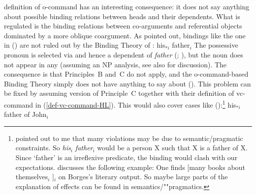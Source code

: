 \documentclass[output=paper,biblatex,babelshorthands,newtxmath,draftmode,colorlinks,citecolor=brown]{langscibook}
\begin{document}
 definition of o-command has an interesting consequence: it does not say anything about possible
binding relations between heads and their dependents. What is regulated is the binding relations
between co-arguments and referential objects dominated by a more oblique coargument. As
\citet[]{Mueller99a} pointed out, bindings like the one in () are not ruled out by
the Binding Theory of \citet[Chapter~6]{ps2}: 
\ea
his$_{*i}$ father$_i$
\z
The possessive pronoun is selected via \spr and hence a dependent of \emph{father}
(\citealt{MuellerHeadless,MyPM2021a}; \crossrefchapteralt[\page \pageref{knjiga-avm}]{agreement}), but the noun does not appear in any \argstl (assuming an NP
analysis, see also  for discussion). The consequence is that Principles~B and~C do not apply, and the o-command-based Binding Theory simply
does not have anything to say about (). This problem can be fixed by assuming 
version of Principle~C together with their definition of vc-command in (\ref{def-vc-command-HL}).
This would also cover cases like ():\footnote{%
\gisu pointed out to me that many \iwithini violations may be due to semantic/pragmatic
  constraints. So \emph{his$_i$ father$_i$} would be a person X such that X is a father of X. Since
  `father' is an irreflexive predicate, the binding would clash with our expectations. \citet[]{Culicover1997a-u} discusses the following example:
\ea
One finds [many books about themselves$_{i}$ ]$_{i}$  on Borges’s literary output.
\z
So maybe large parts of the explanation of \iwithini effects can be found in semantics/""pragmatics.
}
\ea
his$_{*i}$ father of John$_i$
\z
\end{document}
